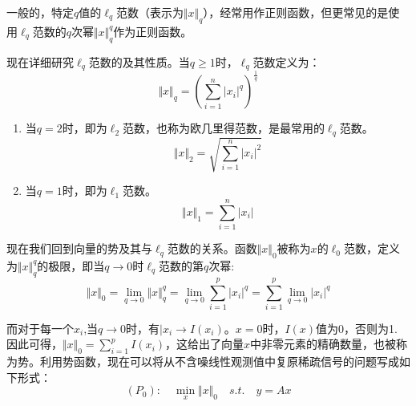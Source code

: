 一般的，特定$q$值的$ \ell_q $范数（表示为$ \Vert x \Vert_q $），经常用作正则函数，但更常见的是使用$ \ell_q $范数的$q$次幂$ \Vert x \Vert_q^q $作为正则函数。

现在详细研究$ \ell_q $范数的及其性质。当$ q\geq 1 $时，$ \ell_q $范数定义为：
\begin{equation}\label{key}
\Vert x \Vert_q = \left(\sum_{i=1}^{n}|x_i|^q\right)^{\frac{1}{q}}
\end{equation}


\begin{enumerate}
	\item 当$ q=2 $时，即为$ \ell_2 $范数，也称为欧几里得范数，是最常用的$ \ell_q $范数。
	\begin{equation}\label{key}
		\Vert x \Vert_2 = \sqrt{\sum_{i=1}^{n}|x_i|^2}
	\end{equation}
	\item 当$ q=1 $时，即为$ \ell_1 $范数。
	\begin{equation}\label{key}
		\Vert x \Vert_1 = \sum_{i=1}^{n}|x_i|
	\end{equation}
\end{enumerate}

现在我们回到向量的势及其与$ \ell_q $范数的关系。函数$ \Vert x \Vert_0 $被称为$ x $的$ \ell_0 $范数，定义为$ \Vert x \Vert_q^q $的极限，即当$ q\rightarrow 0 $时$ \ell_q $范数的第$ q $次幂:
\begin{equation}\label{key}
\Vert x \Vert_0 = \lim_{q\rightarrow 0}\Vert x \Vert_q^q = \lim_{q\rightarrow 0} \sum_{i=1}^{p}| x_i |^q = \sum_{i=1}^{p}\lim_{q\rightarrow 0} | x_i |^q
\end{equation}

而对于每一个$ x_i $,当$ q\rightarrow 0 $时，有$ |x_i\rightarrow I(x_i) $。$ x=0 $时，$ I(x) $值为0，否则为1.
因此可得，$\Vert x \Vert_0=\sum_{i=1}^{p}I(x_i)$，这给出了向量$ x $中非零元素的精确数量，也被称为势。利用势函数，现在可以将从不含噪线性观测值中复原稀疏信号的问题写成如下形式：
\begin{equation}\label{key}
(P_0):\quad  \min_{x} \Vert x \Vert_0 \quad s.t. \quad y =Ax
\end{equation}

